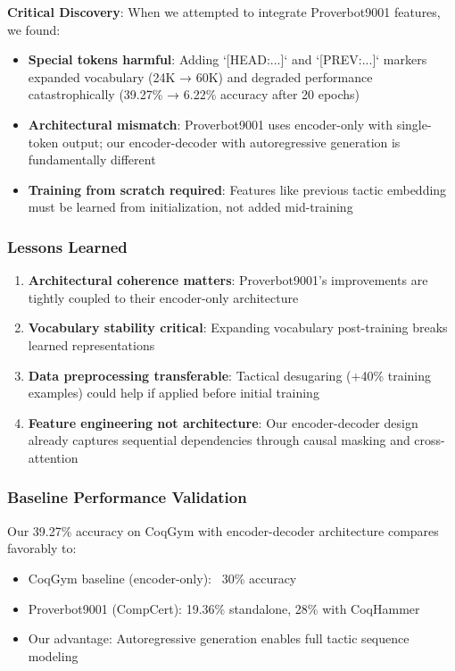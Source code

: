 \documentclass[12pt]{article}
\begin{document}
\textbf{Critical Discovery}: When we attempted to integrate Proverbot9001 features, we found:

\begin{itemize}
\item \textbf{Special tokens harmful}: Adding `[HEAD:...]` and `[PREV:...]` markers expanded vocabulary (24K → 60K) and degraded performance catastrophically (39.27\% → 6.22\% accuracy after 20 epochs)
\item \textbf{Architectural mismatch}: Proverbot9001 uses encoder-only with single-token output; our encoder-decoder with autoregressive generation is fundamentally different
\item \textbf{Training from scratch required}: Features like previous tactic embedding must be learned from initialization, not added mid-training
\end{itemize}

\subsubsection{Lessons Learned}

\begin{enumerate}
\item \textbf{Architectural coherence matters}: Proverbot9001's improvements are tightly coupled to their encoder-only architecture
\item \textbf{Vocabulary stability critical}: Expanding vocabulary post-training breaks learned representations
\item \textbf{Data preprocessing transferable}: Tactical desugaring (+40\% training examples) could help if applied before initial training
\item \textbf{Feature engineering not architecture}: Our encoder-decoder design already captures sequential dependencies through causal masking and cross-attention
\end{enumerate}

\subsubsection{Baseline Performance Validation}

Our 39.27\% accuracy on CoqGym with encoder-decoder architecture compares favorably to:
\begin{itemize}
\item CoqGym baseline (encoder-only): ~30\% accuracy \cite{yang2019learning}
\item Proverbot9001 (CompCert): 19.36\% standalone, 28\% with CoqHammer
\item Our advantage: Autoregressive generation enables full tactic sequence modeling
\end{itemize}
\end{document}
